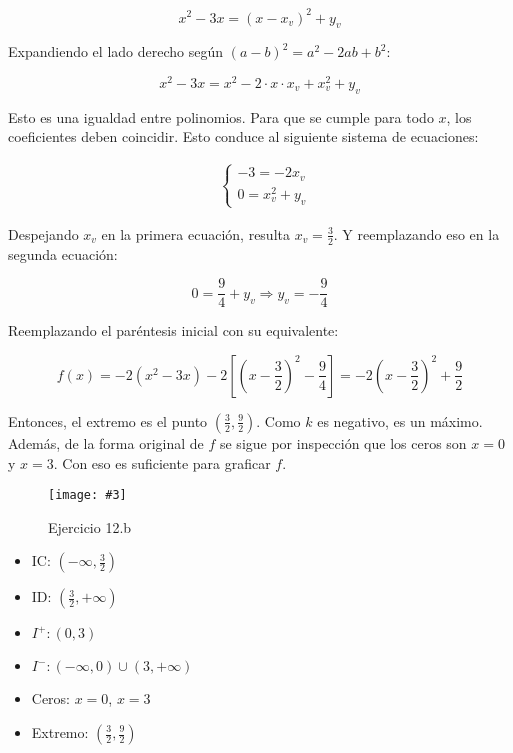 \documentclass{article}
\newcommand{\figurex}[4]{\begin{figure}[ht] \caption{#1} \texttt{[image: \#3]} \centering \label{#4}\end{figure}}
\begin{document}
\begin{equation}
x^2 - 3x = (x-x_v)^2 + y_v
\end{equation}

Expandiendo el lado derecho según $(a - b)^2 = a^2 - 2ab +b^2$:

\begin{equation}
x^2 - 3x = x^2 - 2 \cdot x \cdot x_v + x_v^2 + y_v
\end{equation}

Esto es una igualdad entre polinomios. Para que se cumple para todo $x$, los coeficientes deben coincidir. Esto conduce al siguiente sistema de ecuaciones:

\begin{subequations}
\begin{align}
& \left\{ \begin{array}{ll}
-3 = -2 x_v \\
0 = x_v^2 + y_v
\end{array} \right.
\end{align}
\end{subequations}

Despejando $x_v$ en la primera ecuación, resulta $x_v = \frac{3}{2}$. Y reemplazando eso en la segunda ecuación:

\begin{equation}
0 = \frac{9}{4} + y_v \Rightarrow y_v = -\frac{9}{4}
\end{equation}

Reemplazando el paréntesis inicial con su equivalente:

\begin{equation}
f(x) = -2 (x^2 - 3x) -2 \left[ \left(x - \frac{3}{2}\right)^2 - \frac{9}{4} \right] = -2 \left( x -\frac{3}{2} \right)^2 + \frac{9}{2}
\end{equation}

Entonces, el extremo es el punto $\left( \frac{3}{2}, \frac{9}{2} \right)$. Como $k$ es negativo, es un máximo. Además, de la forma original de $f$ se sigue por inspección que los ceros son $x = 0$ y $x = 3$. Con eso es suficiente para graficar $f$.

\figurex{Ejercicio 12.b}{1.3}{../img/guide_01/ex_12b.png}{fig:12b}

\begin{itemize}

\item IC: $\left(-\infty, \frac{3}{2} \right)$

\item ID: $\left( \frac{3}{2}, +\infty \right)$

\item $I^+: (0, 3)$

\item $I^-: (-\infty, 0) \cup (3, +\infty)$

\item Ceros: $x = 0$, $x = 3$

\item Extremo: $\left( \frac{3}{2}, \frac{9}{2} \right)$

\end{itemize}
\end{document}
